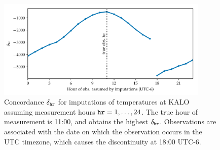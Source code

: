 \documentclass[12pt]{article}
\begin{document}
\begin{figure}[tbp]
\centering
\includegraphics[height=0.4\textheight,width=0.9\textwidth,keepaspectratio]{../figures/hr_inference.pdf}
\caption{
    \label{fig:hr_inference}
    Concordance \(\concordance_\hour\) for imputations of temperatures at KALO assuming measurement hours \(\hour=1,\dotsc,24\). 
    The true hour of measurement is 11:00, and obtains the highest \(\delta_\hour\).
    Observations are associated with the date on which the observation occurs in the UTC timezone, which causes the discontinuity at 18:00 UTC-6.
    }
\end{figure}
\end{document}
